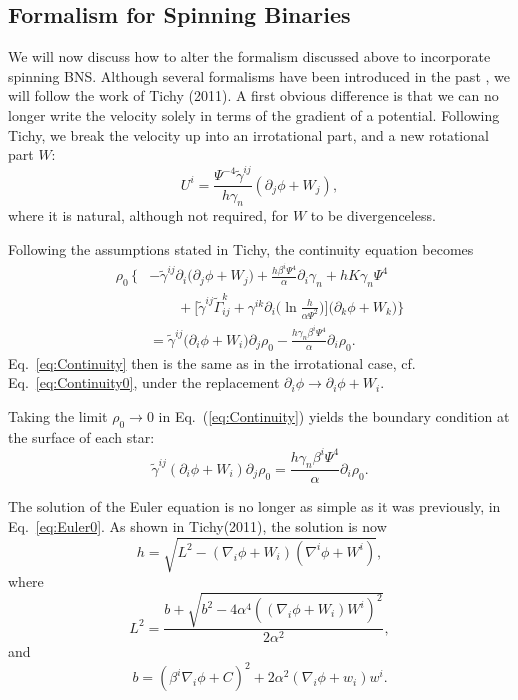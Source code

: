 {\subsection{Formalism for Spinning Binaries}
We will now discuss how to alter the formalism discussed above to
incorporate spinning BNS. Although several formalisms have been
introduced in the past \cite{Marronetti:2003gk}\cite{Baumgarte:2009fw}, we will
follow the work of Tichy (2011)\cite{Tichy:2011gw}. A
first obvious difference is that we can no longer write the velocity
solely in terms of the gradient of a potential. Following Tichy, we
break the velocity up into an irrotational part, and a new rotational
part $W$:
\begin{equation}
U^i =
\frac{\Psi^{-4}\tilde{\gamma}^{ij}}{h\gamma_n}\left(\partial_j\phi+W_j\right),
\end{equation}
where it is natural, although not required, for $W$ to be
  divergenceless.

Following the assumptions stated in Tichy\cite{Tichy:2011gw}, the continuity equation becomes
\begin{align}
\rho_0\,\bigg\{\!\!&-\tilde{\gamma}^{ij}\partial_i\big(\partial_j\phi+W_j\big)  + \frac{h\beta^i\Psi^4}{\alpha}\partial_i\gamma_n + hK\gamma_n\Psi^4 \nonumber\\
&\qquad+\Big[\tilde{\gamma}^{ij}\tilde{\Gamma}^k_{ij}+\gamma^{ik}\partial_i\big(\ln \frac{h}{\alpha\Psi^2}\big)\Big] 
\big(\partial_k\phi+W_k\big) \bigg\} \nonumber \\
&=\tilde{\gamma}^{ij}\big(\partial_i\phi+W_i\big)\partial_j\rho_0 - \frac{h\gamma_n\beta^i\Psi^4}{\alpha}\partial_i\rho_0.
\label{eq:Continuity}
\end{align}
Eq.~\ref{eq:Continuity} then is the same as in the irrotational
case, cf. Eq.~\ref{eq:Continuity0}, under the replacement $\partial_i\phi\rightarrow\partial_i\phi+W_i$.

Taking the limit $\rho_0\to 0$ in Eq.~(\ref{eq:Continuity}) yields the
boundary condition at the surface of each star:
\begin{equation}
\tilde{\gamma}^{ij}\left(\partial_i\phi+W_i\right)\partial_j\rho_0=\frac{h\gamma_n\beta^i\Psi^4}{\alpha}\partial_i\rho_0.
\end{equation}

The solution of the Euler equation is no longer as simple as it was
previously, in Eq.~\ref{eq:Euler0}. As
shown in Tichy(2011)\cite{Tichy:2011gw}, the solution is
now
\begin{equation}
h = \sqrt{L^2 -
  \left(\nabla_i\phi+W_i\right)\left(\nabla^i\phi+W^i\right)},
\end{equation}
where
\begin{equation}
L^2 =
\frac{b+\sqrt{b^2-4\alpha^4\left(\left(\nabla_i\phi+W_i\right)W^i\right)^2}}{2\alpha^2},
\end{equation}
and
\begin{equation}
b =
\left(\beta^i\nabla_i\phi+C\right)^2+2\alpha^2\left(\nabla_i\phi+w_i\right)w^i.
\end{equation}

}
